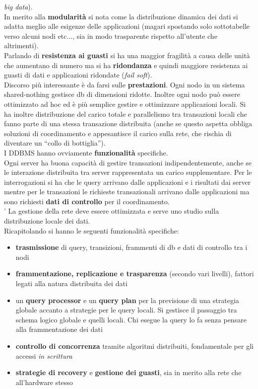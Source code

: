\documentclass[a4paper,12pt, oneside]{book}
\begin{document}
\textit{big data}).\\
In merito alla \textbf{modularità} si nota come la distribuzione dinamica dei
dati si adatta meglio alle esigenze delle applicazioni (magari spostando solo
sottotabelle verso alcuni nodi etc$\ldots$, sia in modo trasparente rispetto
all'utente che altrimenti).\\
Parlando di \textbf{resistenza ai guasti} si ha una maggior fragilità a causa
delle unità che aumentano di numero ma si ha \textbf{ridondanza} e quindi
maggiore resistenza ai guasti di dati e applicazioni ridondate (\textit{fail
  soft}).\\
Discorso più interessante è da farsi sulle \textbf{prestazioni}. Ogni nodo in un
sistema shared-nothing gestisce db di dimensioni ridotte. Inoltre ogni nodo può
essere ottimizzato ad hoc ed è più semplice gestire e ottimizzare applicazioni
locali. Si ha inoltre distribuzione del carico totale e parallelismo  tra
transazioni locali che fanno parte di una stessa transazione distribuita (anche
se questo aspetta obbliga soluzioni di coordinamento e appesantisce il carico
sulla rete, che rischia di diventare un ``collo di bottiglia'').\\
I DDBMS hanno ovviamente \textbf{funzionalità} specifiche.\\
Ogni server ha buona capacità di gestire transazioni indipendentemente, anche se
le interazione distribuita tra server rappresentata un carico supplementare. Per
le interrogazioni si ha che le query arrivano dalle applicazioni e i risultati
dai server mentre per le transazioni le richieste transazionali arrivano dalle
applicazioni ma sono richiesti \textbf{dati di controllo} per il
coordinamento.\\’
La gestione della rete deve essere ottimizzata e serve uno studio sulla
distribuzione locale dei dati.\\
Ricapitolando si hanno le seguenti funzionalità specifiche:
\begin{itemize}
  \item \textbf{trasmissione} di query, transizioni, frammenti di db e dati di
  controllo tra i nodi
  \item \textbf{frammentazione, replicazione e trasparenza} (secondo vari
  livelli), fattori legati alla natura distribuita dei dati
  \item un \textbf{query processor} e un \textbf{query plan} per la previsione
  di una strategia globale accanto a strategie per le query locali. Si gestisce
  il passaggio tra schema logico globale e quelli locali. Chi esegue
  la query lo fa senza pensare alla frammentazione dei dati
  \item \textbf{controllo di concorrenza} tramite algoritmi distribuiti,
  fondamentale per gli accessi \textit{in scrittura}
  \item \textbf{strategie di recovery} e \textbf{gestione dei guasti}, sia in
  merito alla rete che all'hardware stesso
\end{itemize}
\end{document}
